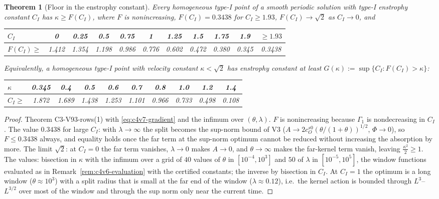 \documentclass[11pt]{article}
\theoremstyle{plain}
\newtheorem{theorem}{Theorem}[section]
\theoremstyle{definition}
\theoremstyle{remark}
\begin{document}
\begin{theorem}[Floor in the enstrophy constant]
\label{thm:c4v7-floor}
Every homogeneous type-I point of a smooth periodic solution with
type-I enstrophy constant \(C_I\) has \(\kappa\ge F(C_I)\), where \(F\) is nonincreasing,
\(F(C_I)=0.3438\) for \(C_I\ge1.93\), \(F(C_I)\to\sqrt2\) as \(C_I\to0\), and
\medskip
\begin{center}\small
\begin{tabular}{@{}lcccccccccc@{}}
\toprule
\(C_I\) & 0 & 0.25 & 0.5 & 0.75 & 1 & 1.25 & 1.5 & 1.75 & 1.9 & \(\ge1.93\)\\
\midrule
\(F(C_I)\ge\) & 1.412 & 1.354 & 1.198 & 0.986 & 0.776 & 0.602 & 0.472 & 0.380 & 0.345 & 0.3438\\
\bottomrule
\end{tabular}
\end{center}
\medskip
Equivalently, a homogeneous type-I point with velocity constant
\(\kappa<\sqrt2\) has enstrophy constant at least \(G(\kappa):=\sup\{C_I:F(C_I)>\kappa\}\):
\medskip
\begin{center}\small
\begin{tabular}{@{}lccccccccc@{}}
\toprule
\(\kappa\) & 0.345 & 0.4 & 0.5 & 0.6 & 0.7 & 0.8 & 1.0 & 1.2 & 1.4\\
\midrule
\(C_I\ge\) & 1.872 & 1.689 & 1.438 & 1.253 & 1.101 & 0.966 & 0.733 & 0.498 & 0.108\\
\bottomrule
\end{tabular}
\end{center}
\medskip
\end{theorem}

\begin{proof}
Theorem C3-V93-rows(1) with \eqref{eq:c4v7-gradient} and the infimum
over \((\theta,\lambda)\).  \(F\) is nonincreasing because \(\Gamma_1\) is nondecreasing in
\(C_I\).  The value \(0.3438\) for large \(C_I\): with \(\lambda\to\infty\) the split becomes the
sup-norm bound of V3 (\(A\to2c_O^{s0}(\theta/(1+\theta))^{1/2}\), \(\Phi\to0\)), so \(F\le0.3438\)
always, and equality holds once the far term at the sup-norm
optimum cannot be reduced without increasing the absorption by
more.  The limit \(\sqrt2\): at \(C_I=0\) the far term vanishes, \(\lambda\to0\) makes
\(A\to0\), and \(\theta\to\infty\) makes the far-kernel term vanish, leaving \(\frac{\kappa^2}2\ge1\).
The values: bisection in \(\kappa\) with the infimum over a grid of \(40\)
values of \(\theta\) in \([10^{-4},10^3]\) and \(50\) of \(\lambda\) in \([10^{-5},10^5]\), the window
functions evaluated as in Remark~\ref{rem:c4v6-evaluation} with the
certified constants; the inverse by bisection in \(C_I\).  At \(C_I=1\) the
optimum is a long window (\(\theta\approx10^3\)) with a split radius that is
small at the far end of the window (\(\lambda\approx0.12\)), i.e.\ the kernel action
is bounded through \(L^3\)--\(L^{3/2}\) over most of the window and through
the sup norm only near the current time.
\end{proof}
\end{document}
